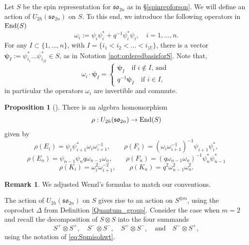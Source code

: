 \documentclass[10pt]{amsart}
\numberwithin{equation}{section}
\theoremstyle{definition}
\newtheorem{remark}[theorem]{Remark}
\newtheorem{proposition}[theorem]{Proposition}
\newcommand{\End}{{\rm End}}
\newcommand{\son}[1][2n]{\mathfrak{so}_{#1}}
\newcommand{\ot}{\otimes}
\newcommand{\hwp}{\boldsymbol{\psi}}
\begin{document}
Let $S$ be the spin representation for $\son$ as in \S\ref{spinrepforson}. We will define an action of $U_{2h}(\son[2n])$ on $S$. To this end, we introduce the following operators in $\End(S)$
\begin{equation*}
    \omega_i:=\psi_i \psi_i^{*}+q^{-1}\psi_i^{*}\psi_i, \quad i=1, \dots, n.
\end{equation*}
For any $I\subset \{1,\dots,n\}$, with $I=\{i_1< i_2 < \dots < i_{|I|}\}$, there is a vector $\hwp_{I}:= \psi_{i_1}^{*} \dots \psi_{i_{|I|}}^{*}\in S$, as in Notation \ref{not:orderedbasisforS}. Note that, 
\[
\omega_i\cdot \hwp_{I} = \begin{cases}
    \hwp_I \quad \text{if $i\notin I$, and }\\
    q^{-1}\hwp_I \quad \text{if $i\in I$},
\end{cases}
\]
in particular the operators $\omega_i$ are invertible and commute. 

\begin{proposition}[{\cite[Proposition 3.1]{Wenzl-Spin}}]\label{QG_so2n_action}
    There is an algebra homomorphism 
    \[
    \rho:U_{2h}(\son)\rightarrow \End(S)
    \]
    given by
\begin{equation*}
    \rho(E_i)=\psi_i\psi_{i+1}^{*}\omega_i\omega_{i+1}^{-1}, \qquad \rho(F_i)=(\omega_i\omega_{i+1}^{-1})^{-1}\psi_{i+1}\psi_{i}^{*},
\end{equation*}
\begin{equation*}
    \rho(E_n)=\psi_{n-1}\psi_n q\omega_{n-1}\omega_{n}, \qquad \rho(F_n)=(q\omega_{n-1}\omega_{n})^{-1}\psi_n^{*}\psi_{n-1}^{*}
\end{equation*}
\begin{equation*}
    \rho(K_i)= \omega_i^2 \omega_{i+1}^{-2}, \qquad \rho(K_n)= q^2 \omega_{n-1}^2 \omega_n^{2}.
\end{equation*}
\end{proposition} 

\begin{remark}
    We adjusted Wenzl's formulas to match our conventions.
\end{remark}

The action of $U_{2h}(\son)$ on $S$ gives rise to an action on $S^{\otimes m} $, using the coproduct $\Delta$ from Definition \ref{Quantum_group}. Consider the case when $m=2$ and recall the decomposition of $S\ot S$ into the four summands
\begin{equation}\label{eq:foursummands}
S^{+}\ot S^{+}, \quad S^{-}\ot S^{-}, \quad S^{+}\ot S^{-}, \quad \text{and} \quad S^{-}\ot S^{+},
\end{equation}
using the notation of \eqref{eq:Spmisohwt}. 
\end{document}
